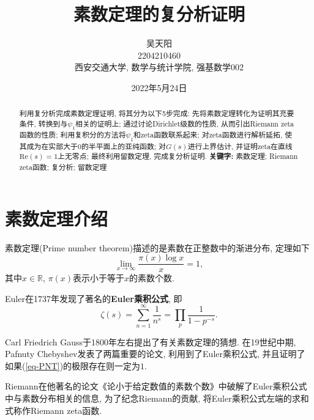 \documentclass[12pt, a4paper, oneside]{ctexart}
\numberwithin{equation}{section}  %
\def\R{\mathbb{R}}          %
\def\re{\mathrm{Re}}        %
\def\add{\vspace{1ex}}      %
\begin{document}
\title{素数定理的复分析证明}
\author{
吴天阳\\[1ex]
2204210460\\[1ex]
西安交通大学, 数学与统计学院, 强基数学002\\[1ex]
}
\date{2022年5月24日}

\maketitle %

\begin{abstract}
    利用复分析完成素数定理证明, 将其分为以下5步完成: 先将素数定理转化为证明其充要条件, 转换到与$\psi_1$相关的证明上; 通过讨论Dirichlet级数的性质, 从而引出Riemann zeta函数的性质; 利用复积分的方法将$\psi_1$和zeta函数联系起来; 对zeta函数进行解析延拓, 使其成为在实部大于$0$的半平面上的亚纯函数; 对$G(s)$进行上界估计, 并证明zeta在直线$\re(s)=1$上无零点; 最终利用留数定理, 完成复分析证明.
    \add\add
    \textbf{关键字: }素数定理; Riemann zeta函数; 复分析; 留数定理
\end{abstract}
\clearpage %
\tableofcontents %

\clearpage

\section{素数定理介绍}
素数定理(Prime number theorem)描述的是素数在正整数中的渐进分布, 定理如下
\begin{equation}\label{eq-PNT}
    \lim_{x\to\infty}\frac{\pi(x)\log x}{x} = 1,
\end{equation}
其中$x\in \R$, $\pi(x)$表示小于等于$x$的素数个数.

Euler在1737年发现了著名的\textbf{Euler乘积公式}, 即
\begin{equation*}
    \zeta(s) = \sum_{n=1}^\infty\frac{1}{n^s} = \prod_p\frac{1}{1-p^{-s}}.
\end{equation*}

Carl Friedrich Gauss于1800年左右提出了有关素数定理的猜想. 在19世纪中期, Pafnuty Chebyshev发表了两篇重要的论文, 利用到了Euler乘积公式, 并且证明了如果(\ref{eq-PNT})的极限存在则一定为$1$.

Riemann在他著名的论文《论小于给定数值的素数个数》中破解了Euler乘积公式中与素数分布相关的信息, 为了纪念Riemann的贡献, 将Euler乘积公式左端的求和式称作Riemann zeta函数.
\end{document}
